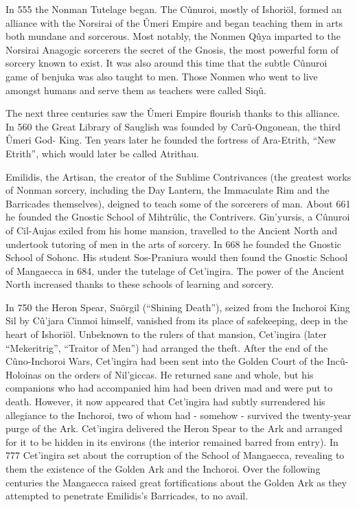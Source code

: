 \documentclass[]{book}
\begin{document}
In 555 the Nonman Tutelage began. The Cûnuroi, mostly of Ishoriöl, formed an
alliance with the Norsirai of the Ûmeri Empire and began teaching them in arts both
mundane and sorcerous. Most notably, the Nonmen Qûya imparted to the Norsirai
Anagogic sorcerers the secret of the Gnosis, the most powerful form of sorcery known
to exist. It was also around this time that the subtle Cûnuroi game of benjuka was also
taught to men. Those Nonmen who went to live amongst humans and serve them as
teachers were called Siqû.

The next three centuries saw the Ûmeri Empire flourish thanks to this alliance. In 560
the Great Library of Sauglish was founded by Carû-Ongonean, the third Ûmeri God-
King. Ten years later he founded the fortress of Ara-Etrith, ``New Etrith'', which would
later be called Atrithau.

Emilidis, the Artisan, the creator of the Sublime Contrivances (the greatest works of
Nonman sorcery, including the Day Lantern, the Immaculate Rim and the Barricades
themselves), deigned to teach some of the sorcerers of man. About 661 he founded the
Gnostic School of Mihtrûlic, the Contrivers. Gin'yursis, a Cûnuroi of Cil-Aujas exiled
from his home mansion, travelled to the Ancient North and undertook tutoring of
men in the arts of sorcery. In 668 he founded the Gnostic School of Sohonc. His
student Sos-Praniura would then found the Gnostic School of Mangaecca in 684,
under the tutelage of Cet'ingira. The power of the Ancient North increased thanks to
these schools of learning and sorcery.

In 750 the Heron Spear, Suörgil (``Shining Death''), seized from the Inchoroi King Sil
by Cû'jara Cinmoi himself, vanished from its place of safekeeping, deep in the heart of
Ishoriöl. Unbeknown to the rulers of that mansion, Cet'ingira (later ``Mekeritrig'',
``Traitor of Men'') had arranged the theft. After the end of the Cûno-Inchoroi Wars,
Cet'ingira had been sent into the Golden Court of the Incû-Holoinas on the orders of
Nil'giccas. He returned sane and whole, but his companions who had accompanied him
had been driven mad and were put to death. However, it now appeared that Cet'ingira
had subtly surrendered his allegiance to the Inchoroi, two of whom had - somehow -
survived the twenty-year purge of the Ark. Cet'ingira delivered the Heron Spear to the
Ark and arranged for it to be hidden in its environs (the interior remained barred from
entry). In 777 Cet'ingira set about the corruption of the School of Mangaecca, revealing
to them the existence of the Golden Ark and the Inchoroi. Over the following
centuries the Mangaecca raised great fortifications about the Golden Ark as they
attempted to penetrate Emilidis's Barricades, to no avail.
\end{document}
